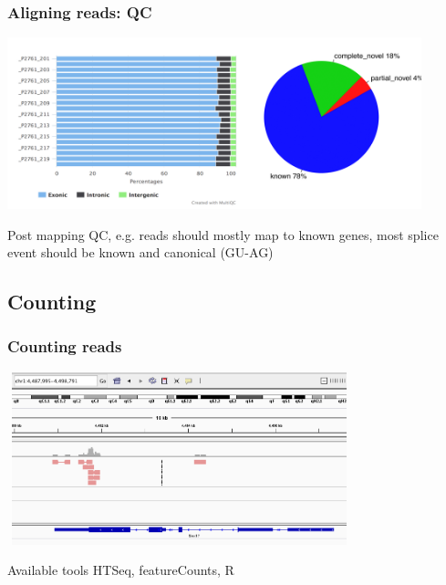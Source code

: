 \documentclass{beamer}\usepackage[]{graphicx}\usepackage[]{color}
\begin{document}


\begin{frame}
\frametitle{Aligning reads: QC}
\begin{center}
\includegraphics[width=12cm]{Images/map_qual.png}
\end{center}
Post mapping QC, e.g. reads should mostly map to known genes, most splice event should be known and canonical (GU-AG)
\end{frame}

\subsection{Counting}
\begin{frame}
\frametitle{Counting reads}
\begin{center}
\includegraphics[width=10cm, height=5cm]{Images/counts_IGV.png}
\end{center}
\begin{block}{Available tools}
HTSeq, featureCounts, R
\end{block}
\end{frame}
\end{document}
